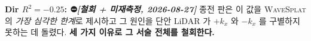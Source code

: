 \documentclass[11pt]{report}
\numberwithin{equation}{chapter}
\numberwithin{figure}{chapter}
\numberwithin{table}{chapter}
\newcommand{\WS}{\textsc{WaveSplat}}
\begin{document}

\textbf{Dir $R^2 = -0.25$: ⛔\emph{[철회 + 미재측정, 2026-08-27]}}
종전 판은 이 값을 \WS{}의 \emph{가장 심각한 한계}로 제시하고 그 원인을 단안 LiDAR 가
$+k_x$ 와 $-k_x$ 를 구별하지 못하는 데 돌렸다. \textbf{세 가지 이유로 그 서술 전체를
철회한다.}
\end{document}

